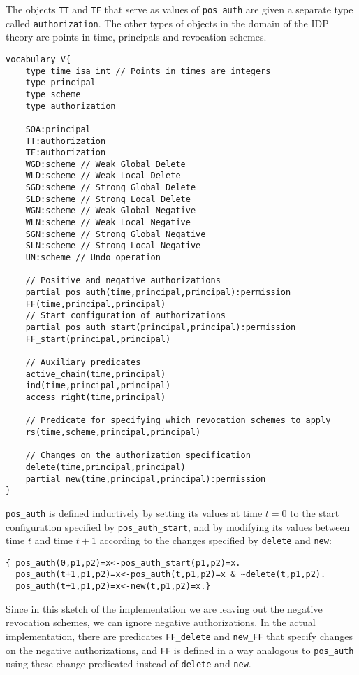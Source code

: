 \documentclass[runningheads]{llncs}
\begin{document}
The objects \texttt{TT} and \texttt{TF} that serve as values of \texttt{pos\_{}auth} are given a separate type called \texttt{authorization}. The other types of objects in the domain of the IDP theory are points in time, principals and revocation schemes.

\begin{lstlisting}[caption={The vocabulary of the IDP implementation},label={vocab}]
vocabulary V{
	type time isa int // Points in times are integers
	type principal
	type scheme
	type authorization
	
	SOA:principal
	TT:authorization
	TF:authorization
	WGD:scheme // Weak Global Delete
	WLD:scheme // Weak Local Delete
	SGD:scheme // Strong Global Delete
	SLD:scheme // Strong Local Delete
	WGN:scheme // Weak Global Negative
	WLN:scheme // Weak Local Negative
	SGN:scheme // Strong Global Negative
	SLN:scheme // Strong Local Negative
	UN:scheme // Undo operation
	
	// Positive and negative authorizations
	partial pos_auth(time,principal,principal):permission
	FF(time,principal,principal)
	// Start configuration of authorizations
	partial pos_auth_start(principal,principal):permission
	FF_start(principal,principal)
	
	// Auxiliary predicates
	active_chain(time,principal)
	ind(time,principal,principal)
	access_right(time,principal) 
	
	// Predicate for specifying which revocation schemes to apply
	rs(time,scheme,principal,principal)
	
	// Changes on the authorization specification
	delete(time,principal,principal) 
	partial new(time,principal,principal):permission
}
\end{lstlisting}
\texttt{pos\_{}auth} is defined inductively by setting its values at time $t=0$ to the start configuration specified by \texttt{pos\_{}auth\_{}start}, and by modifying its values between time $t$ and time $t+1$ according to the changes specified by \texttt{delete} and \texttt{new}:
\begin{lstlisting}[caption={The definition of the authorization specification at a given time},label={specification}]
{ pos_auth(0,p1,p2)=x<-pos_auth_start(p1,p2)=x.
  pos_auth(t+1,p1,p2)=x<-pos_auth(t,p1,p2)=x & ~delete(t,p1,p2).
  pos_auth(t+1,p1,p2)=x<-new(t,p1,p2)=x.}
\end{lstlisting}
Since in this sketch of the implementation we are leaving out the negative revocation schemes, we can ignore negative authorizations. In the actual implementation, there are predicates \texttt{FF\_{}delete} and \texttt{new\_{}FF} that specify changes on the negative authorizations, and \texttt{FF} is defined in a way analogous to \texttt{pos\_{}auth} using these change predicated instead of \texttt{delete} and \texttt{new}.
\end{document}
